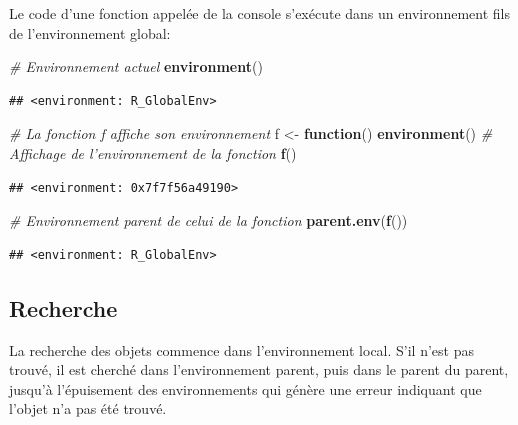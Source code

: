 \documentclass[
  12pt,
  french,
  a4paper,
  extrafontsizes,onecolumn,openright
  ]{memoir}
\newenvironment{Shaded}{\begin{snugshade}}{\end{snugshade}}
\newcommand{\CommentTok}[1]{\textcolor[rgb]{0.56,0.35,0.01}{\textit{#1}}}
\newcommand{\ControlFlowTok}[1]{\textcolor[rgb]{0.13,0.29,0.53}{\textbf{#1}}}
\newcommand{\KeywordTok}[1]{\textcolor[rgb]{0.13,0.29,0.53}{\textbf{#1}}}
\newcommand{\NormalTok}[1]{#1}
\newcommand{\StringTok}[1]{\textcolor[rgb]{0.31,0.60,0.02}{#1}}
\begin{document}
\normalsize

Le code d'une fonction appelée de la console s'exécute dans un environnement fils de l'environnement global:

\scriptsize

\begin{Shaded}
\begin{Highlighting}[]
\CommentTok{# Environnement actuel}
\KeywordTok{environment}\NormalTok{()}
\end{Highlighting}
\end{Shaded}

\begin{verbatim}
## <environment: R_GlobalEnv>
\end{verbatim}

\begin{Shaded}
\begin{Highlighting}[]
\CommentTok{# La fonction f affiche son environnement}
\NormalTok{f <-}\StringTok{ }\ControlFlowTok{function}\NormalTok{() }\KeywordTok{environment}\NormalTok{()}
\CommentTok{# Affichage de l'environnement de la fonction}
\KeywordTok{f}\NormalTok{()}
\end{Highlighting}
\end{Shaded}

\begin{verbatim}
## <environment: 0x7f7f56a49190>
\end{verbatim}

\begin{Shaded}
\begin{Highlighting}[]
\CommentTok{# Environnement parent de celui de la fonction}
\KeywordTok{parent.env}\NormalTok{(}\KeywordTok{f}\NormalTok{())}
\end{Highlighting}
\end{Shaded}

\begin{verbatim}
## <environment: R_GlobalEnv>
\end{verbatim}

\normalsize

\hypertarget{recherche}{%
\subsection{Recherche}\label{recherche}}

La recherche des objets commence dans l'environnement local.
S'il n'est pas trouvé, il est cherché dans l'environnement parent, puis dans le parent du parent, jusqu'à l'épuisement des environnements qui génère une erreur indiquant que l'objet n'a pas été trouvé.
\end{document}

